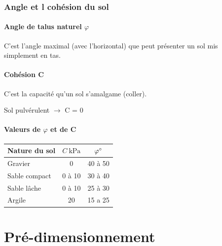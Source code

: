 \documentclass[12pt,a4paper]{article}
\begin{document}
	
	
	\section{Angle et l cohésion du sol}
	
	\subsection{Angle de talus naturel $\varphi$}
	
	C'est l'angle maximal (avec l'horizontal) que peut présenter un sol mis simplement en tas.
	
	\subsection{Cohésion C}
	
	C'est la capacité qu'un sol s'amalgame (coller).
	
	Sol pulvérulent $\rightarrow$ C = 0
	
	\subsection{Valeurs de $\varphi$ et de C}
	
	
	
	\begin{table}[H]
		\begin{center}
			\begin{tabular}{l|c|c}
				Nature du sol & $C ~\unit{\kilo\pascal}$ & $\varphi\degree$ \\ \hline
				Gravier & 0 & 40 à 50 \\
				Sable compact & 0 à 10 & 30 à 40 \\
				Sable lâche & 0 à 10 & 25 à 30 \\
				Argile & 20 & 15 a 25
			\end{tabular}
		\end{center}
	\end{table}
	
	
	
	
	
	\part{Pré-dimensionnement}
	
	
	
\end{document}
